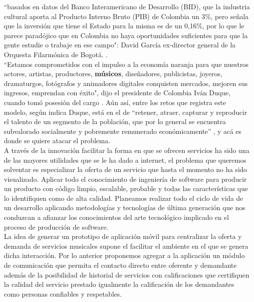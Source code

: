 ``basados en datos del Banco Interamericano de Desarrollo (BID), que la industria cultural aporta al Producto Interno Bruto (PIB) de Colombia un 3\%, pero señala que la inversión que tiene el Estado para la misma es de un 0,16\%, por lo que le parece paradójico que en Colombia no haya oportunidades suficientes para que la gente estudie o trabaje en ese campo": David García ex-director general de la Orquesta Filarmónica de Bogotá. .\\

``Estamos comprometidos con el impulso a la economía naranja para que nuestros actores, artistas, productores, \textbf{músicos}, diseñadores, publicistas, joyeros, dramaturgos, fotógrafos y animadores digitales conquisten mercados, mejoren sus ingresos, emprendan con éxito", dijo el presidente de Colombia Iván Duque, cuando tomó posesión del cargo . Aún así, entre los retos que registra este modelo, según indica Duque, está en el de ``retener, atraer, capturar y reproducir el talento de un segmento de la población, que por lo general se encuentra subvalorado socialmente y pobremente remunerado económicamente” , y acá es donde se quiere atacar el problema. \\

A través de la innovación facilitar la forma en que se ofrecen servicios ha sido una de las mayores utilidades que se le ha dado a internet, el problema que queremos solventar es especializar la oferta de un servicio que hasta el momento no ha sido visualizado. Aplicar todo el conocimiento de ingeniería de software para producir un producto con código limpio, escalable, probable y todas las características que lo identifiquen como de alta calidad. Planeamos realizar todo el ciclo de vida de un desarrollo aplicando metodologías y tecnologías de última generación que nos conduzcan a afianzar los conocimientos del arte tecnológico implicado en el proceso de producción de software.\\

La idea de generar un prototipo de aplicación móvil para centralizar la oferta y demanda de servicios musicales supone el facilitar el ambiente en el que se genera dicha interacción. Por lo anterior proponemos agregar a la aplicación un módulo de comunicación que permita el contacto directo entre oferente y demandante además de la posibilidad de historial de servicios con calificaciones que certifiquen la calidad del servicio prestado igualmente la calificación de los demandantes como personas confiables y respetables.



